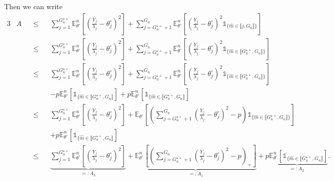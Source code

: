 Then we can write
\begin{alignat*}{3}
& A && \leq && \sum\limits_{j = 1}^{G_{n}^{\star+}} \mathds{E}_{\theta^{\circ}}^{n}\left[\left(\frac{Y_{j}}{\lambda_{j}} - \theta^{\circ}_{j}\right)^{2}\right] + \sum\limits_{j = G_{n}^{\star+} + 1}^{G_{n}} \mathds{E}_{\theta^{\circ}}^{n} \left[ \left(\frac{Y_{j}}{\lambda_{j}} - \theta^{\circ}_{j} \right)^{2} \mathds{1}_{\{\widehat{m} \in \llbracket j, G_{n} \rrbracket\}}\right]\\
& && \leq && \sum\limits_{j = 1}^{G_{n}^{\star+}} \mathds{E}_{\theta^{\circ}}^{n}\left[\left(\frac{Y_{j}}{\lambda_{j}} - \theta^{\circ}_{j}\right)^{2}\right] + \sum\limits_{j = G_{n}^{\star+} + 1}^{G_{n}} \mathds{E}_{\theta^{\circ}}^{n} \left[ \left(\frac{Y_{j}}{\lambda_{j}} - \theta^{\circ}_{j} \right)^{2} \mathds{1}_{\{\widehat{m} \in \llbracket G_{n}^{\star+}, G_{n} \rrbracket\}}\right]\\
& && \leq && \sum\limits_{j = 1}^{G_{n}^{\star+}} \mathds{E}_{\theta^{\circ}}^{n}\left[\left(\frac{Y_{j}}{\lambda_{j}} - \theta^{\circ}_{j}\right)^{2}\right] + \sum\limits_{j = G_{n}^{\star+} + 1}^{G_{n}} \mathds{E}_{\theta^{\circ}}^{n} \left[ \left(\frac{Y_{j}}{\lambda_{j}} - \theta^{\circ}_{j} \right)^{2} \mathds{1}_{\{\widehat{m} \in \llbracket G_{n}^{\star+}, G_{n} \rrbracket\}}\right] \\
& && && - p\mathds{E}_{\theta^{\circ}}^{n}\left[\mathds{1}_{\{\widehat{m} \in \llbracket G_{n}^{\star+}, G_{n} \rrbracket}\right] + p \mathds{E}_{\theta^{\circ}}^{n}\left[\mathds{1}_{\{\widehat{m} \in \llbracket G_{n}^{\star+}, G_{n} \rrbracket}\right]\\
& && \leq && \sum\limits_{j = 1}^{G_{n}^{\star+}} \mathds{E}_{\theta^{\circ}}^{n}\left[\left(\frac{Y_{j}}{\lambda_{j}} - \theta^{\circ}_{j}\right)^{2}\right] + \mathds{E}_{\theta^{\circ}} \left[ \left(\sum\limits_{j = G_{n}^{\star+} + 1}^{G_{n}}\left(\frac{Y_{j}}{\lambda_{j}} - \theta^{\circ}_{j} \right)^{2} - p\right) \mathds{1}_{\{\widehat{m} \in \llbracket G_{n}^{\star+}, G_{n} \rrbracket\}}\right]\\
& && && + p \mathds{E}_{\theta^{\circ}}^{n}\left[\mathds{1}_{\{\widehat{m} \in \llbracket G_{n}^{\star+}, G_{n} \rrbracket}\right]\\
& && \leq && \underbrace{\sum\limits_{j = 1}^{G_{n}^{\star+}} \mathds{E}_{\theta^{\circ}}^{n}\left[\left(\frac{Y_{j}}{\lambda_{j}} - \theta^{\circ}_{j}\right)^{2}\right]}_{=: A_{3}} + \underbrace{\mathds{E}_{\theta^{\circ}}^{n} \left[ \left(\sum\limits_{j = G_{n}^{\star+} + 1}^{G_{n}}\left(\frac{Y_{j}}{\lambda_{j}} - \theta^{\circ}_{j} \right)^{2} - p\right)_{+}\right]}_{=: A_{1}} + \underbrace{p \mathds{E}_{\theta^{\circ}}^{n}\left[\mathds{1}_{\{\widehat{m} \in \llbracket G_{n}^{\star+}, G_{n} \rrbracket}\right]}_{=: A_{2}} .
\end{alignat*}


